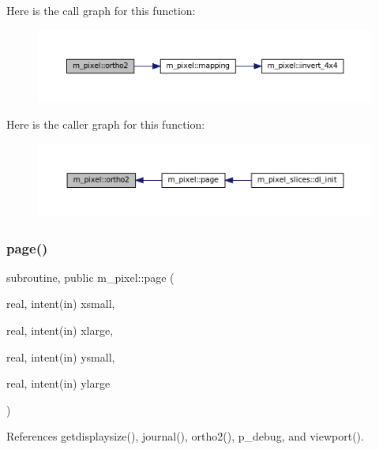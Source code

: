 Here is the call graph for this function\+:
\nopagebreak
\begin{figure}[H]
\begin{center}
\leavevmode
\includegraphics[width=350pt]{namespacem__pixel_a80dece6adac704024a5a76efee697770_cgraph}
\end{center}
\end{figure}
Here is the caller graph for this function\+:
\nopagebreak
\begin{figure}[H]
\begin{center}
\leavevmode
\includegraphics[width=350pt]{namespacem__pixel_a80dece6adac704024a5a76efee697770_icgraph}
\end{center}
\end{figure}
\mbox{\label{namespacem__pixel_a6733a8657ca9f51b2648690dbae258c9}} 
\subsubsection{\texorpdfstring{page()}{page()}}
{\footnotesize\ttfamily subroutine, public m\+\_\+pixel\+::page (\begin{DoxyParamCaption}\item[{real, intent(in)}]{xsmall,  }\item[{real, intent(in)}]{xlarge,  }\item[{real, intent(in)}]{ysmall,  }\item[{real, intent(in)}]{ylarge }\end{DoxyParamCaption})}



References getdisplaysize(), journal(), ortho2(), p\+\_\+debug, and viewport().

